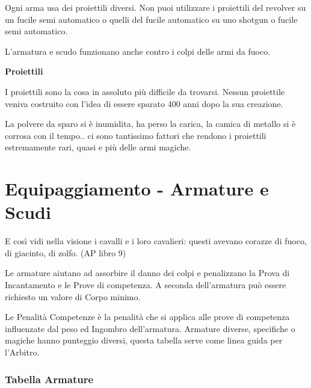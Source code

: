 \documentclass[12pt,a4paper,twoside,openany]{book}
\begin{document}
\begin{multicols}{2}
\bigskip

Ogni arma usa dei proiettili diversi. Non puoi utilizzare i proiettili del revolver su un fucile semi automatico o quelli del fucile automatico su uno shotgun o fucile semi automatico.

L'armatura e scudo funzionano anche contro i colpi delle armi da fuoco.

\begin{center}
	\textbf{Proiettili}
\end{center}

I proiettili sono la cosa in assoluto più difficile da trovarsi. Nessun proiettile veniva costruito con l'idea di essere sparato 400 anni dopo la sua creazione.

La polvere da sparo si è inumidita, ha perso la carica, la camica di metallo si è corrosa con il tempo.. ci sono tantissimo fattori che rendono i proiettili estremamente rari, quasi e più delle armi magiche.

\end{multicols}

\pagebreak

\section{Equipaggiamento - Armature e Scudi} \hypertarget{equipaggiamento.armature.scudi}{}\label{equipaggiamentoarmature}

\label{equipaggiamento---armature-e-scudi}

\begin{changemargin}{0.3cm}{0.3cm}\begin{enfasi}{
E così vidi nella visione i cavalli e i loro cavalieri: questi avevano corazze di fuoco, di giacinto, di zolfo. (AP libro 9)} \end{enfasi}\end{changemargin}\medskip

Le armature aiutano ad assorbire il danno dei colpi e penalizzano la Prova di Incantamento e le Prove di competenza. A seconda dell'armatura può essere richiesto un valore di Corpo minimo.

Le Penalità Competenze è la penalità che si applica alle prove di competenza influenzate dal peso ed Ingombro dell'armatura. Armature diverse, specifiche o magiche hanno punteggio diversi, questa tabella serve come linea guida per l'Arbitro.

\subsubsection{Tabella Armature}
\end{document}
